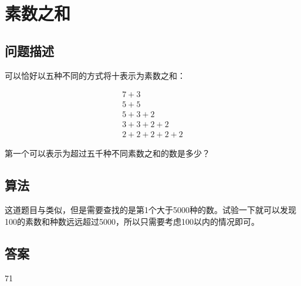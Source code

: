 \section{素数之和}\label{sec:problem77}
\subsection{问题描述}
\begin{tcolorbox}

	可以恰好以五种不同的方式将十表示为素数之和：

	\begin{align*}
		7 + 3         \\
		5 + 5         \\
		5 + 3 + 2     \\
		3 + 3 + 2 + 2 \\
		2 + 2 + 2 + 2 + 2
	\end{align*}

	第一个可以表示为超过五千种不同素数之和的数是多少？
\end{tcolorbox}

\subsection{算法}
这道题目与类似，但是需要查找的是第1个大于5000种的数。试验一下就可以发现100的素数和种数远远超过5000，所以只需要考虑100以内的情况即可。

\subsection{答案}
71
